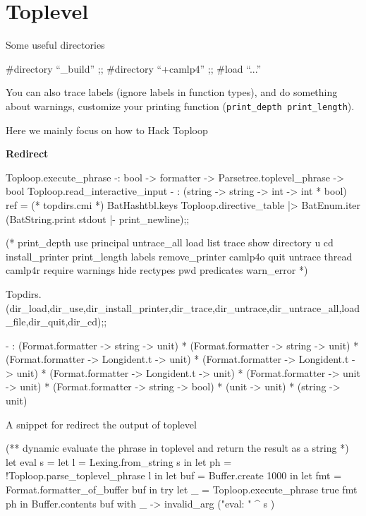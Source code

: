 \section{Toplevel}

Some useful directories
\begin{bluetext}
#directory ``_build'' ;; #directory ``+camlp4'' ;; #load ``...''
\end{bluetext}

You can also trace labels (ignore labels in function types), and do
something about warnings, customize your printing function
(\verb|print_depth print_length|).

Here we mainly focus on how to Hack Toploop

\textbf{Redirect}

\begin{ocamlcode}
Toploop.execute_phrase 
-: bool -> formatter -> Parsetree.toplevel_phrase -> bool
Toploop.read_interactive_input
- : (string -> string -> int -> int * bool) ref = (* topdirs.cmi *)
BatHashtbl.keys Toploop.directive_table |> BatEnum.iter (BatString.print stdout |- print_newline);;

(* print_depth use principal untrace_all load list trace show
directory u cd install_printer print_length labels remove_printer
camlp4o quit untrace thread camlp4r require warnings hide rectypes pwd
predicates warn_error *)

Topdirs.(dir_load,dir_use,dir_install_printer,dir_trace,dir_untrace,dir_untrace_all,load_file,dir_quit,dir_cd);;  

- : (Format.formatter -> string -> unit) *
    (Format.formatter -> string -> unit) *
    (Format.formatter -> Longident.t -> unit) *
    (Format.formatter -> Longident.t -> unit) *
    (Format.formatter -> Longident.t -> unit) *
    (Format.formatter -> unit -> unit) *
    (Format.formatter -> string -> bool) * (unit -> unit) * (string -> unit)
\end{ocamlcode}

A snippet for redirect the output of toplevel
\begin{ocamlcode}
(** dynamic evaluate the phrase in toplevel and return the result
    as a string 
*)
let eval s = 
  let l = Lexing.from_string s in 
  let ph = !Toploop.parse_toplevel_phrase l in 
  let buf = Buffer.create 1000 in 
  let fmt = Format.formatter_of_buffer buf in 
  try 
    let _ = Toploop.execute_phrase true fmt ph in 
    Buffer.contents buf 
  with 
      _ -> invalid_arg ("eval: " ^ s )
\end{ocamlcode}

